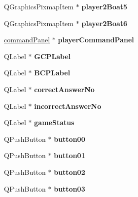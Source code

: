 \begin{DoxyCompactItemize}
Q\+Graphics\+Pixmap\+Item $\ast$ {\bfseries player2\+Boat5}
\item 
\mbox{\label{classGame1GamePage_a54fc09dfc5e07a30650a70b56ea03b13}} 
Q\+Graphics\+Pixmap\+Item $\ast$ {\bfseries player2\+Boat6}
\item 
\mbox{\label{classGame1GamePage_a7d49025fb26d96a30bf57dd3d0df4591}} 
\hyperlink{classcommandPanel}{command\+Panel} $\ast$ {\bfseries player\+Command\+Panel}
\item 
\mbox{\label{classGame1GamePage_ae8b91ab81442125ecb68f53c75ad33d7}} 
Q\+Label $\ast$ {\bfseries G\+C\+P\+Label}
\item 
\mbox{\label{classGame1GamePage_af2a336703f379f45151221a66b5cbe21}} 
Q\+Label $\ast$ {\bfseries B\+C\+P\+Label}
\item 
\mbox{\label{classGame1GamePage_aba0851ff24c3db694ae5200c3739a465}} 
Q\+Label $\ast$ {\bfseries correct\+Answer\+No}
\item 
\mbox{\label{classGame1GamePage_ab55f7f14e0d8c73a24b7edafd59b90d7}} 
Q\+Label $\ast$ {\bfseries incorrect\+Answer\+No}
\item 
\mbox{\label{classGame1GamePage_af412a77fccdebe1d0a4f07699174f08c}} 
Q\+Label $\ast$ {\bfseries game\+Status}
\item 
\mbox{\label{classGame1GamePage_acfa716f34e6b3fa19392a69e9022af35}} 
Q\+Push\+Button $\ast$ {\bfseries button00}
\item 
\mbox{\label{classGame1GamePage_a11bcc55eacd28fe6117994114e8c8134}} 
Q\+Push\+Button $\ast$ {\bfseries button01}
\item 
\mbox{\label{classGame1GamePage_a4d1752207e24d7413bc516202c48e2c4}} 
Q\+Push\+Button $\ast$ {\bfseries button02}
\item 
\mbox{\label{classGame1GamePage_ae40d26d7fb7cebf2984588d87ec63841}} 
Q\+Push\+Button $\ast$ {\bfseries button03}

\end{DoxyCompactItemize}
